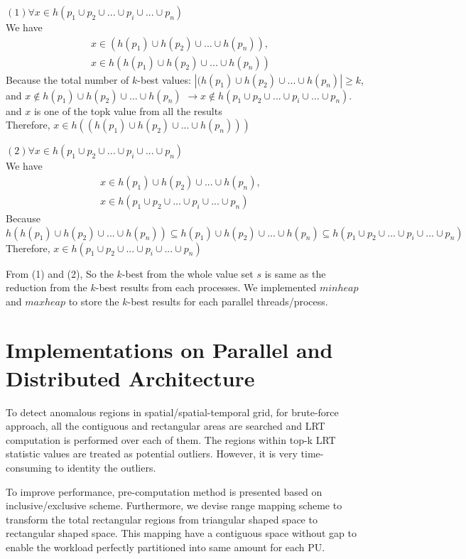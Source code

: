 \documentclass[AMA,LATO1COL]{WileyNJD-v2}
\begin{document}
\noindent $(1)\forall x\in h(p_1\cup p_2\cup ...\cup p_i \cup...\cup p_n)$\\
We have
\vspace{-5mm}
\begin{eqnarray}
x\in (h(p_1)\cup h(p_2)\cup ...\cup h(p_n)),&\\
 x\in h(h(p_1)\cup h(p_2)\cup ...\cup h(p_n))
\end{eqnarray}
Because the total number of $k$-best values:
$|(h(p_1)\cup h(p_2)\cup ...\cup h(p_n)|\ge k$, \\
and $x \notin h(p_1)\cup h(p_2)\cup ...\cup h(p_n)$ $\rightarrow x \notin h(p_1\cup p_2\cup ...\cup p_i \cup...\cup p_n)$.\\   and $x$ is one of the topk value from all the results\\
Therefore, $x\in h((h(p_1)\cup h(p_2)\cup ...\cup h(p_n)))$

\noindent $(2) \forall x\in h(p_1\cup p_2\cup ...\cup p_i \cup...\cup p_n)$\\
We have
\vspace{-5mm}
\begin{eqnarray}
x\in h(p_1)\cup h(p_2)\cup ...\cup h(p_n),&\\
x\in h(p_1\cup p_2\cup ...\cup p_i \cup...\cup p_n)
\end{eqnarray}
Because $h(h(p_1)\cup h(p_2)\cup ...\cup h(p_n))\subseteq h(p_1)\cup h(p_2)\cup ...\cup h(p_n) \subseteq h(p_1\cup p_2\cup ...\cup p_i \cup...\cup p_n)$\\
Therefore, $x\in h(p_1\cup p_2\cup ...\cup p_i \cup...\cup p_n)$

From (1) and (2), So the $k$-best from the whole value set $s$ is same as the reduction from the $k$-best results from each processes. We implemented $minheap$ and $maxheap$ to store the $k$-best results for each parallel threads/process.

\section {Implementations on Parallel and Distributed Architecture }\label{IMPDA}
To detect anomalous regions in spatial/spatial-temporal grid, for brute-force approach, all the contiguous and rectangular areas are searched and LRT computation is performed over each of them. The regions within top-k LRT statistic values are treated as potential outliers. However, it is very time-consuming to identity the outliers.

To improve performance, pre-computation method is presented based on inclusive/exclusive scheme. Furthermore, we devise range mapping scheme to transform the total rectangular regions from triangular shaped space to rectangular shaped space. This mapping have a contiguous space without gap to enable the workload perfectly partitioned into same amount for each PU.
\end{document}
